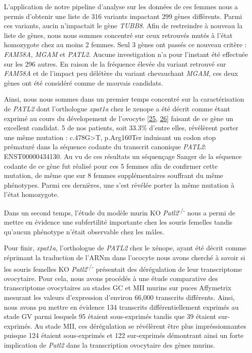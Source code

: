 \documentclass[12pt,twoside]{reedthesis}
\theoremstyle{definition}
\theoremstyle{definition}
\theoremstyle{remark}
\begin{document}
  L'application de notre pipeline d'analyse sur les données de ces femmes
  nous a permis d'obtenir une liste de 316 variants impactant 299 gènes
  différents. Parmi ces variants, aucin n'impactait le gène \emph{TUBB8}.
  Afin de restreindre à nouveau la liste de gènes, nous nous sommes
  concentré sur ceux retrouvés mutés à l'état homozygote chez au moins 2
  femmes. Seul 3 gènes ont passés ce nouveau critère : \emph{FAM58A},
  \emph{MGAM} et \emph{PATL2}. Aucune investigation n'a pour l'instant été
  effectuée sur les 296 autres. En raison de la fréquence élevée du
  variant retrouvé sur \emph{FAM58A} et de l'impact peu délétère du
  variant chevauchant \emph{MGAM}, ces deux gènes ont été considéré comme
  de mauvais candidats.
  
  Ainsi, nous nous sommes dans un premier temps concentré sur la
  caractérisation de \emph{PATL2} dont l'orthologue \emph{xpat1a} chez le
  xenope a été décrit comme étant exprimé au cours du dévelopement de
  l'ovocyte {[}\protect\hyperlink{ref-Marnef2010}{25},
  \protect\hyperlink{ref-Nakamura2010}{26}{]} faisant de ce gène un
  excellent candidat. 5 de nos patients, soit 33.3\% d'entre elles,
  révélèrent porter une même mutation : c.478G\textgreater{}T, p.Arg160Ter
  induisant un codon stop prématuré dans la séquence codante du transcrit
  canonique \emph{PATL2}: ENST00000434130. Au vu de ces résultats un
  séquençage Sanger de la séquence codante de ce gène fut réalisé pour ces
  5 femmes afin de confirmer cette mutation, de même que sur 8 femmes
  supplémentaires souffrant du même phénotypes. Parmi ces dernières, une
  s'est révélée porter la même mutation à l'état homozygote.
  
  Dans un second temps, l'étude du modèle murin KO
  \emph{Patl2}\textsuperscript{-/-} nous a permi de mettre en évidence une
  subfertilité importante chez les souris femelles tandis qu'aucun
  phénotype n'était observable chez les mâles.
  
  Pour finir, \emph{xpat1a}, l'orthologue de \emph{PATL2} chez le xénope,
  ayant été décrit comme réprimant la traduction de l'ARNm dans l'ococyte
  nous avons cherché à savoir si les souris femelles KO
  \emph{Patl2}\textsuperscript{-/-} présentait des dérégulation de leur
  transcriptome ovocytaire. Pour cela, nous avons procédés à une étude
  comparative des transcriptome ovocytaires au stades GC et MII murins sur
  puces Affymetrix mesurant les valeurs d'expression d'environ 66,000
  transcrits différents. Ainsi, nous avons pu mettre en évidence 134
  transcrits différentiellement exprimés au stade GV parmi lesquels 95
  étaient sous-exprimés tandis que 39 étaient sur-exprimés. Au stade MII,
  ces dérégulation se révélèrent être plus impréssionnantes puisque 124
  étaient sous-exprimés et 122 sur-exprimés démontrant ainsi un forte
  implication de \emph{Patl2} dans la transcription ovocytaire des gènes
  murins.
  
\end{document}

